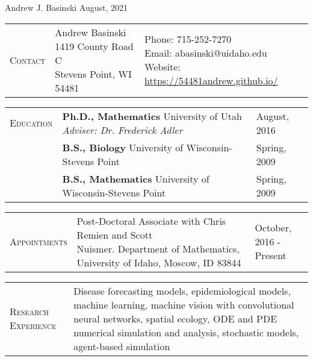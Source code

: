 \documentclass[11pt]{article}
\newcommand{\cellone}{3.5cm} %
\newcommand{\celltwo}{11cm}
\newcommand{\cellthree}{4cm}
\newcommand{\incellone}{3cm}
\newcommand{\incelltwo}{5cm}
\newcommand{\incellthree}{10cm}
\newcommand{\spa}{\vspace{.4in}}
\begin{document}
{\huge Andrew J. Basinski \hspace{2.5in} August, 2021}

\noindent\makebox[\linewidth]{\rule{\linewidth}{0.4pt}}

\spa

\begin{tabularx}{\textwidth}{p{\incellone} p{\incelltwo} p{\incellthree}}

  C\textsc{ontact} & \parbox[t]{5 cm}{Andrew Basinski \\ 1419 County Road C \\ Stevens Point, WI 54481} & \parbox[t]{8cm}{Phone: 715-252-7270\\
    Email: abasinski@uidaho.edu \\
    Website: \url{https://54481andrew.github.io/}
  } \\

\end{tabularx}

\spa

\begin{tabularx}{\textwidth}{p{\cellone} p{\celltwo} p{\cellthree}}
E\textsc{ducation} & \parbox[t]{\celltwo}{{\bf Ph.D., Mathematics} University of Utah \\  \emph{Adviser: Dr. Frederick Adler}} &  August, 2016 \\[.5in]   

		          & \parbox[t][0cm]{13cm}{{\bf B.S., Biology} University of Wisconsin-Stevens Point} & Spring, 2009 \\
		          & \parbox[t]{13cm}{{\bf B.S., Mathematics} University of Wisconsin-Stevens Point} & Spring, 2009 \\
\end{tabularx}

\spa

\begin{tabularx}{\textwidth}{p{\cellone} p{\celltwo} p{\cellthree}}
    \parbox[t][0cm]{\cellone}{A\textsc{ppointments}}  & \parbox[t]{10cm}{Post-Doctoral Associate with Chris Remien and Scott \\ Nuismer. Department of Mathematics, University of Idaho, Moscow, ID 83844} & \parbox[t][]{\cellthree}{October, 2016 - \\ Present}
\end{tabularx}




\spa

\begin{tabularx}{\textwidth}{p{\cellone} p{\celltwo}}
  \parbox[t][0cm]{\cellone}{R\textsc{esearch} E\textsc{xperience}} & \parbox[t][0cm]{12cm}{
    Disease forecasting models, epidemiological models, machine learning, machine vision with convolutional neural networks, spatial ecology, ODE and PDE numerical simulation and analysis, stochastic models, agent-based simulation}
\end{tabularx}
\end{document}
